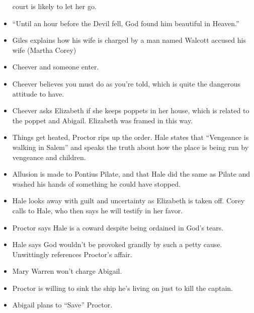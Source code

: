 \documentclass[10pt]{article}
\begin{document}
\begin{itemize}
		court is likely to let her go.
	\item ``Until an hour before the Devil fell, God found him beautiful
		in Heaven.''
	\item Giles explains how his wife is charged by a man named Walcott
		accused his wife (Martha Corey) 
	\item Cheever and someone enter.
	\item Cheever believes you must do as you're told, which is quite the
		dangerous attitude to have.
	\item Cheever asks Elizabeth if she keeps poppets in her house, which
		is related to the poppet and Abigail.  Elizabeth was framed in this
		way.
	\item Things get heated, Proctor rips up the order.  Hale states that
		``Vengeance is walking in Salem'' and speaks the truth about how the
		place is being run by vengeance and children.
	\item Allusion is made to Pontius Pilate, and that Hale did the same
		as Pilate and washed his hands of something he could have stopped.
	\item Hale looks away with guilt and uncertainty as Elizabeth is taken
		off.  Corey calls to Hale, who then says he will testify in her
		favor.  
	\item Proctor says Hale is a coward despite being ordained in God's 
		tears.
	\item Hale says God wouldn't be provoked grandly by such a petty cause.
		Unwittingly references Proctor's affair.  
	\item Mary Warren won't charge Abigail.
	\item Proctor is willing to sink the ship he's living on just to kill
		the captain.
	\item Abigail plans to ``Save'' Proctor.
\end{itemize}
\end{document}
